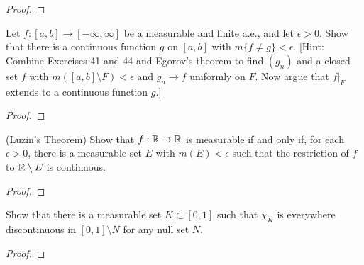 \documentclass{article}
\begin{document}
\begin{proof}
\end{proof}
 Let $f: [a,b] \to [-\infty,\infty]$ be a measurable and finite a.e., and let $\epsilon >0$. Show that there is a continuous function $g$ on $[a,b]$ with $m\{f \ne g\} < \epsilon$. [Hint: Combine Exercises 41 and 44 and Egorov's theorem to find $(g_n)$ and a closed set $f$ with $m([a,b]\setminus F) < \epsilon$ and $g_n \to f$ uniformly on $F$. Now argue that $f|_F$ extends to a continuous function $g$.]
\begin{proof}
\end{proof}
 (Luzin's Theorem) Show that $f: \mathbb{R}\to\mathbb{R}$ is measurable if and only if, for each $\epsilon >0$, there is a measurable set $E$ with $m(E) < \epsilon$ such that the restriction of $f$ to $\mathbb{R}\setminus E$ is continuous.
\begin{proof}
\end{proof}
 Show that there is a measurable set $K \subset [0,1]$ such that $\chi_K$ is everywhere discontinuous in $[0,1] \setminus N$ for any null set $N$.
\begin{proof}
\end{proof}
\end{document}
